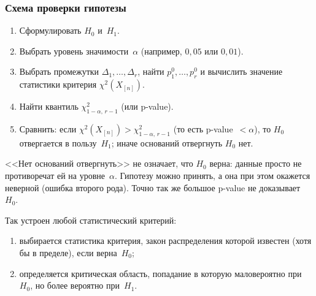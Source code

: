 \subsubsection{Схема проверки гипотезы}

\begin{enumerate}
  \item Сформулировать $H_0$ и~$H_1$.
  \item Выбрать уровень значимости~$\alpha$ (например, $0{,}05$ или $0{,}01$).
  \item Выбрать промежутки $\Delta_1, \ldots, \Delta_r$, найти $p_1^0, \ldots, p_r^0$ и
        вычислить значение статистики критерия $\chi^2(X_{[n]})$.
  \item Найти квантиль $\chi^2_{1-\alpha,\, r-1}$ (или p-value).
  \item Сравнить: если $\chi^2(X_{[n]}) > \chi^2_{1-\alpha,\, r-1}$ (то есть p-value~$< \alpha$),
        то $H_0$ отвергается в пользу~$H_1$; иначе оснований отвергнуть $H_0$ нет.
\end{enumerate}

\begin{remark}
  <<Нет оснований отвергнуть>> не означает, что $H_0$ верна: данные просто
  не противоречат ей на уровне~$\alpha$. Гипотезу можно принять, а она при этом
  окажется неверной (ошибка второго рода). Точно так же большое p-value не доказывает~$H_0$.
\end{remark}

Так устроен любой статистический критерий:
\begin{enumerate}
  \item выбирается статистика критерия, закон распределения которой известен
        (хотя бы в пределе), если верна~$H_0$;
  \item определяется критическая область, попадание в которую маловероятно при~$H_0$,
        но более вероятно при~$H_1$.
\end{enumerate}

